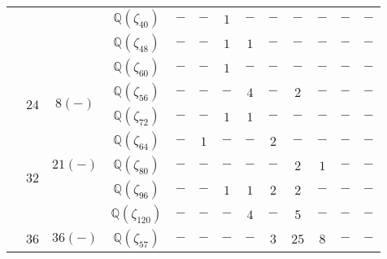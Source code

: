 \documentclass[12pt,a4paper,halfparskip,headsepline,bibtotocnumbered]{scrreprt}
\theoremstyle{nummermitklammern}
\theoremstyle{nonumberbreak}
\newcommand{\Q}{\mathbb{Q}}
\begin{document}
\begin{table}
\begin{tabular}{|c|c|c|c|c|c|c|c|c|c|c|c|c|}
								&						&							&$\Q(\zeta_{40})$	&$-$	&$-$	&$1$	&$-$	&$-$	&$-$	&$-$	&$-$	&$-$\\ \cline{4-13}
								&						&							&$\Q(\zeta_{48})$	&$-$	&$-$	&$1$	&$1$	&$-$	&$-$	&$-$	&$-$	&$-$\\ \cline{4-13}
								&						&							&$\Q(\zeta_{60})$	&$-$	&$-$	&$1$	&$-$	&$-$	&$-$	&$-$	&$-$	&$-$\\ \cline{2-13}
								&\multirow{2}{*}{$24$}	&\multirow{2}{*}{$8(-)$}	&$\Q(\zeta_{56})$	&$-$	&$-$	&$-$	&$4$	&$-$	&$2$	&$-$	&$-$	&$-$\\ \cline{4-13}
								&						&							&$\Q(\zeta_{72})$	&$-$	&$-$	&$1$	&$1$	&$-$	&$-$	&$-$	&$-$	&$-$\\ \cline{2-13}
								&\multirow{4}{*}{$32$}	&\multirow{3}{*}{$21(-)$}	&$\Q(\zeta_{64})$	&$-$	&$1$	&$-$	&$-$	&$2$	&$-$	&$-$	&$-$	&$-$\\ \cline{4-13}
								&						&							&$\Q(\zeta_{80})$	&$-$	&$-$	&$-$	&$-$	&$-$	&$2$	&$1$	&$-$	&$-$\\ \cline{4-13}
								&						&							&$\Q(\zeta_{96})$	&$-$	&$-$	&$1$	&$1$	&$2$	&$2$	&$-$	&$-$	&$-$\\ \cline{4-13}
								&						&							&$\Q(\zeta_{120})$	&$-$	&$-$	&$-$	&$4$	&$-$	&$5$	&$-$	&$-$	&$-$\\ \cline{2-13}
								&$36$					&$36(-)$					&$\Q(\zeta_{57})$	&$-$	&$-$	&$-$	&$-$	&$3$	&$25$	&$8$	&$-$	&$-$\\  \hline
	\end{tabular}
\end{table}
\end{document}
